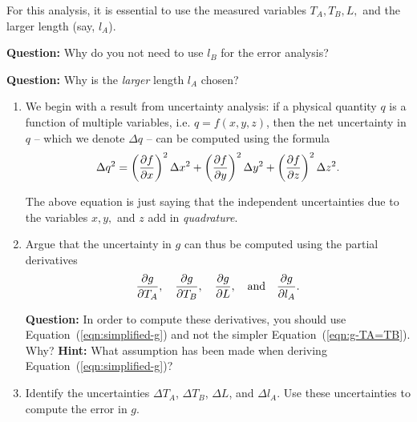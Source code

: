 For this analysis, it is essential to use the measured variables $T_A, T_B, L,$ and the larger length (say, $l_A$).

\begin{question}
\textbf{Question:} Why do you not need to use $l_B$ for the error analysis?

\textbf{Question:} Why is the \textsl{larger} length $l_A$ chosen?
\end{question}


\begin{enumerate}
    \item We begin with a result from uncertainty analysis: if a physical quantity $q$ is a function of multiple variables, i.e. $q = f(x,y,z)$, then the net uncertainty in $q$ -- which we denote $\Delta q$ -- can be computed using the formula
    \begin{equation}
        \Delta q^2 = \left(\pdv{f}{x}\right)^2 \Delta x^2 + \left(\pdv{f}{y}\right)^2 \Delta y^2 + \left(\pdv{f}{z}\right)^2 \Delta z^2.
    \end{equation}

    The above equation is just saying that the independent uncertainties due to the variables $x,y,$ and $z$ add in \textsl{quadrature}.
    
    \item Argue that the uncertainty in $g$ can thus be computed using the partial derivatives $$\pdv{g}{T_A},\quad \pdv{g}{T_B},\quad \pdv{g}{L},\quad \text{and} \quad \pdv{g}{l_A}.$$
    \begin{question}
        \textbf{Question:} In order to compute these derivatives, you should use Equation~(\ref{eqn:simplified-g}) and not the simpler Equation~(\ref{eqn:g-TA=TB}). Why?
        \textbf{Hint:} What assumption has been made when deriving Equation~(\ref{eqn:simplified-g})? 
    \end{question}

    \item Identify the uncertainties $\Delta T_A$, $\Delta T_B$, $\Delta L$, and $\Delta l_A$. Use these uncertainties to compute the error in $g$.
\end{enumerate}

